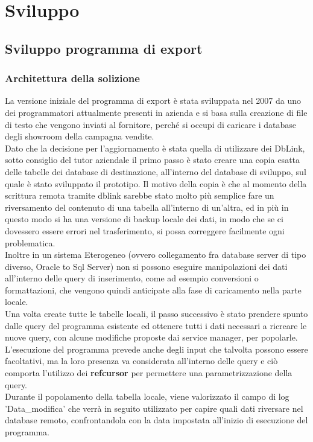 \lstset{
showstringspaces=false
}
\section{Sviluppo}
\subsection{Sviluppo programma di export}
\subsubsection{Architettura della solizione}
La versione iniziale del programma di export è stata sviluppata nel 2007 da uno dei programmatori attualmente presenti in azienda e si basa sulla creazione di file di testo che vengono inviati al fornitore, perché si occupi di caricare i database degli showroom della campagna vendite.\\
Dato che la decisione per l'aggiornamento è stata quella di utilizzare dei DbLink, sotto consiglio del tutor aziendale il primo passo è stato creare una copia esatta delle tabelle dei database di destinazione, all'interno del database di sviluppo, sul quale è stato sviluppato il prototipo. Il motivo della copia è che al momento della scrittura remota tramite dblink sarebbe stato molto più semplice fare un riversamento del contenuto di una tabella all'interno di un'altra, ed in più in questo modo si ha una versione di backup locale dei dati, in modo che se ci dovessero essere errori nel trasferimento,  si possa correggere facilmente ogni problematica. \\Inoltre in un sistema Eterogeneo (ovvero collegamento fra database server di tipo diverso, Oracle to Sql Server) non si possono eseguire manipolazioni dei dati all'interno delle query di inserimento, come ad esempio conversioni o formattazioni, che vengono quindi anticipate alla fase di caricamento nella parte locale.\\
Una volta create tutte le tabelle locali, il passo successivo è stato prendere spunto dalle query del programma esistente ed ottenere tutti i dati necessari a ricreare le nuove query, con alcune modifiche proposte dai service manager, per popolarle. L'esecuzione del programma prevede anche degli input che talvolta possono essere facoltativi, ma la loro presenza va considerata all'interno delle query e ciò comporta l'utilizzo dei \textbf{refcursor} per permettere una parametrizzazione della query.\\
Durante il popolamento della tabella locale, viene valorizzato il campo di log 'Data\_modifica' che verrà in seguito utilizzato per capire quali dati riversare nel database remoto, confrontandola con la data impostata all'inizio di esecuzione del programma.
